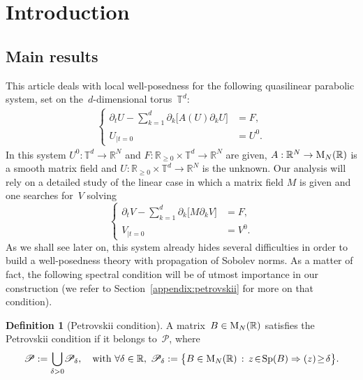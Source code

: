 \documentclass[JEP,XML,SOM,Unicode,published]{cedram}
\let\Re\relax
\DeclareMathOperator{\Re}{Re}
\theoremstyle{definition}
\newtheorem{defi}[prop]{Definition}
\newcommand\R{\mathbb{R}}
\newcommand\T{\mathbb{T}}
\begin{document}
\maketitle
\tableofcontents



\section{Introduction}
\subsection{Main results}
This article deals with local well-posedness for the following quasilinear parabolic system, set on the~$d$-dimensional torus~$\T^d$:
\begin{align}
\label{eq:PtNL}
\left\{
\begin{aligned}
\partial_t U-\sum_{k=1}^d\partial_k \bigl[A(U)\partial_k U\bigr] &= F,\\
U_{|t=0} &= U^0.
\end{aligned}
\right.
\end{align}
In this system $U^0: \T^d \to \R^N$ and $F:\R_{\geq 0}\times \T^d\to \R^N $ are given, $A:\R^N\to\textnormal{M}_N(\R)$ is a smooth matrix field and $U:\R_{\geq 0}\times \T^d\to \R^N $ is the unknown. Our analysis will rely on a detailed study of the linear case in which a matrix field $M$ is given and one searches for~$V$ solving
\begin{equation}
\label{eq:Pt}
\left\{
\begin{aligned}
\partial_t V-\sum_{k=1}^d\partial_k \bigl[M\partial_k V\bigr] &= F,\\
V_{|t=0} &= V^0.
\end{aligned}
\right.
\end{equation}
As we shall see later on, this system already hides several difficulties in order to build a well-posedness theory with propagation of Sobolev norms. As a matter of fact, the following spectral condition will be of utmost importance in our construction (we refer to Section~\ref{appendix:petrovskii} for more on that condition).
\begin{defi}[Petrovskii condition]
A matrix~$B\in\textnormal{M}_N(\R)$ satisfies the Petrovskii condition if it belongs to~$\mathscr{P}$, where
\begin{equation} \label{eq:Pet}\mathscr{P}:=\bigcup_{\delta>0}\!\mathscr{P}_\delta,\quad \text{with } \forall \delta \in \R, \; \mathscr{P}_\delta:= \bigl\{B\in\textnormal{M}_N(\R)\,:\,z\!\in\! \textnormal{Sp}(B) \Rightarrow \Re(z)\!\geq\! \delta\bigr\}.
\end{equation}
\end{defi}
\end{document}
